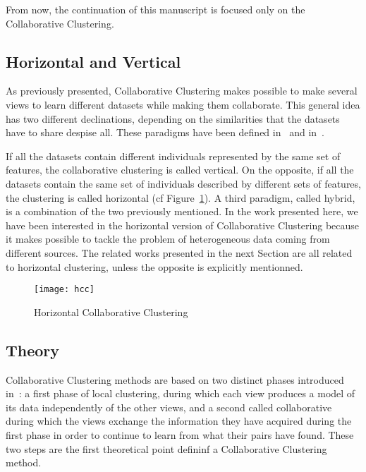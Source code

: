     From now, the continuation of this manuscript is focused only on the Collaborative Clustering.

    \subsection{Horizontal and Vertical}
\label{sec:cc_hor_ver}

    As previously presented, Collaborative Clustering makes possible to make several views to learn different datasets while making them collaborate. This general idea has two different declinations, depending on the similarities that the datasets have to share despise all. These paradigms have been defined in~\cite{pedrycz2005knowledge} and in~\cite{grozavu2010topological}.

    If all the datasets contain different individuals represented by the same set of features, the collaborative clustering is called vertical. On the opposite, if all the datasets contain the same set of individuals described by different sets of features, the clustering is called horizontal (cf Figure~\ref{fig:hor_cc}). A third paradigm, called hybrid, is a combination of the two previously mentioned. In the work presented here, we have been interested in the horizontal version of Collaborative Clustering because it makes possible to tackle the problem of heterogeneous data coming from different sources. The related works presented in the next Section are all related to horizontal clustering, unless the opposite is explicitly mentionned.
    \vspace{.8cm}

        \begin{figure}[h]
            \centering
            \texttt{[image: hcc]}
            \caption{Horizontal Collaborative Clustering}
\label{fig:hor_cc}
        \end{figure}

    \subsection{Theory}
    
    Collaborative Clustering methods are based on two distinct phases introduced in~\cite{pedrycz2002collaborative}: a first phase of local clustering, during which each view produces a model of its data independently of the other views, and a second called collaborative during which the views exchange the information they have acquired during the first phase in order to continue to learn from what their pairs have found. These two steps are the first theoretical point defininf a Collaborative Clustering method.

